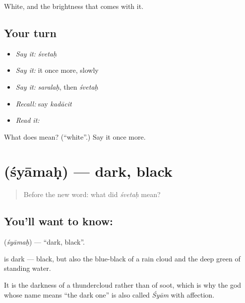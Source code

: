 \begin{grammarlens}[title={What you've built}]
White, and the brightness that comes with it.
\end{grammarlens}

\subsection*{Your turn}
\begin{itemize}
\raggedright
  \item \emph{Say it:} \emph{śvetaḥ}
  \item \emph{Say it:} it once more, slowly
  \item \emph{Say it:} \emph{saralaḥ}, then \emph{śvetaḥ}
  \item \emph{Recall:} say \emph{kadācit}
  \item \emph{Read it:} \textbf{}
\end{itemize}

\begin{tcolorbox}[breakable,colback=teal!4,colframe=teal!35!black,title={Before you move on}]
What does  mean? (\textquotedblleft{}white\textquotedblright{}.) Say it once more.
\end{tcolorbox}
\section[\texorpdfstring{\sk{श्यामः} (śyāmaḥ)}{श्यामः (śyāmaḥ)}]{ (śyāmaḥ) — dark, black}

\label{lesson:SA-C44-dark}



\begin{quote}
Before the new word: what did \emph{śvetaḥ} mean?
\end{quote}

\subsection*{You'll want to know: }
\textbf{} (\emph{śyāmaḥ}) — \textquotedblleft{}dark, black\textquotedblright{}.

\textbf{} is dark — black, but also the blue-black of a rain cloud and the deep green of standing water.

It is the darkness of a thundercloud rather than of soot, which is why the god whose name means \textquotedblleft{}the dark one\textquotedblright{} is also called \emph{Śyām} with affection.

